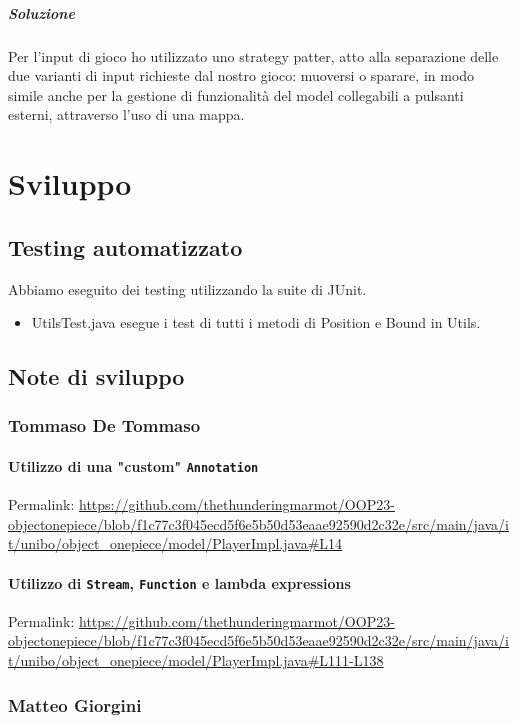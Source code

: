 \documentclass[a4paper,12pt]{report}
\begin{document}
\paragraph{Soluzione} Per l'input di gioco ho utilizzato uno strategy patter, atto alla separazione delle due varianti di input richieste dal nostro gioco: muoversi o sparare, in modo simile anche per la gestione di funzionalità del model collegabili a pulsanti esterni, attraverso l'uso di una mappa.


\chapter{Sviluppo}
\section{Testing automatizzato}

Abbiamo eseguito dei testing utilizzando la suite di JUnit.
%
\begin{itemize}
	\item UtilsTest.java esegue i test di tutti i metodi di Position e Bound in Utils.
\end{itemize}

\section{Note di sviluppo}

\subsection*{Tommaso De Tommaso}
\subsubsection{Utilizzo di una "custom" \texttt{Annotation} }
Permalink: \url{https://github.com/thethunderingmarmot/OOP23-objectonepiece/blob/f1c77c3f045ecd5f6e5b50d53eaae92590d2c32e/src/main/java/it/unibo/object_onepiece/model/PlayerImpl.java#L14}
\subsubsection{Utilizzo di \texttt{Stream}, \texttt{Function} e lambda expressions}
Permalink: \url{https://github.com/thethunderingmarmot/OOP23-objectonepiece/blob/f1c77c3f045ecd5f6e5b50d53eaae92590d2c32e/src/main/java/it/unibo/object_onepiece/model/PlayerImpl.java#L111-L138}

\subsection*{Matteo Giorgini}
\end{document}

